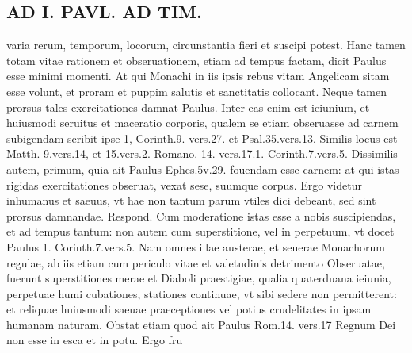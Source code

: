\documentclass{article}
\begin{document}
\begin{pages}
\section*{AD I. PAVL. AD TIM. }
\marginpar{[ p.210 ]}\pstart varia rerum, temporum, locorum, circunstantia fieri et suscipi potest. Hanc tamen totam vitae rationem et obseruationem, etiam ad tempus factam, dicit Paulus esse minimi momenti. At qui Monachi in iis ipsis rebus vitam Angelicam sitam esse volunt, et proram et puppim salutis et sanctitatis collocant. Neque tamen prorsus tales exercitationes damnat Paulus. Inter eas enim est ieiunium, et huiusmodi seruitus et maceratio corporis, qualem se etiam obseruasse ad carnem subigendam scribit ipse 1, Corinth.9. vers.27. et Psal.35.vers.13. Similis locus est Matth. 9.vers.14, et 15.vers.2. Romano. 14. vers.17.1. Corinth.7.vers.5. Dissimilis autem, primum, quia ait Paulus Ephes.5v.29. fouendam esse carnem: at qui istas rigidas exercitationes obseruat, vexat sese, suumque corpus. Ergo videtur inhumanus et saeuus, vt hae non tantum parum vtiles dici debeant, sed sint prorsus damnandae. Respond. Cum moderatione istas esse a nobis suscipiendas, et ad tempus tantum: non autem cum superstitione, vel in perpetuum, vt docet Paulus 1. Corinth.7.vers.5. Nam omnes illae austerae, et seuerae Monachorum regulae, ab iis etiam cum periculo vitae et valetudinis detrimento Obseruatae, fuerunt superstitiones merae et Diaboli praestigiae, qualia quaterduana ieiunia, perpetuae humi cubationes, stationes continuae, vt sibi sedere non permitterent: et reliquae huiusmodi saeuae praeceptiones vel potius crudelitates in ipsam humanam naturam. Obstat etiam quod ait Paulus Rom.14. vers.17 Regnum Dei non esse in esca et in potu. Ergo fru\pend

\end{pages}
\end{document}
